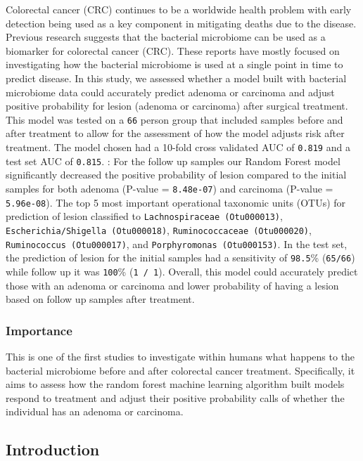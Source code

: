 \documentclass[12pt,]{article}
\begin{document}
Colorectal cancer (CRC) continues to be a worldwide health problem with
early detection being used as a key component in mitigating deaths due
to the disease. Previous research suggests that the bacterial microbiome
can be used as a biomarker for colorectal cancer (CRC). These reports
have mostly focused on investigating how the bacterial microbiome is
used at a single point in time to predict disease. In this study, we
assessed whether a model built with bacterial microbiome data could
accurately predict adenoma or carcinoma and adjust positive probability
for lesion (adenoma or carcinoma) after surgical treatment. This model
was tested on a \texttt{66} person group that included samples before
and after treatment to allow for the assessment of how the model adjusts
risk after treatment. The model chosen had a 10-fold cross validated AUC
of \texttt{0.819} and a test set AUC of \texttt{0.815}. : For the follow
up samples our Random Forest model significantly decreased the positive
probability of lesion compared to the initial samples for both adenoma
(P-value = \texttt{8.48e-07}) and carcinoma (P-value =
\texttt{5.96e-08}). The top 5 most important operational taxonomic units
(OTUs) for prediction of lesion classified to
\texttt{Lachnospiraceae\ (Otu000013)},
\texttt{Escherichia/Shigella\ (Otu000018)},
\texttt{Ruminococcaceae\ (Otu000020)},
\texttt{Ruminococcus\ (Otu000017)}, and
\texttt{Porphyromonas\ (Otu000153)}. In the test set, the prediction of
lesion for the initial samples had a sensitivity of \texttt{98.5}\%
(\texttt{65/66}) while follow up it was \texttt{100}\%
(\texttt{1\ /\ 1}). Overall, this model could accurately predict those
with an adenoma or carcinoma and lower probability of having a lesion
based on follow up samples after treatment.

\newpage

\subsubsection{Importance}\label{importance}

This is one of the first studies to investigate within humans what
happens to the bacterial microbiome before and after colorectal cancer
treatment. Specifically, it aims to assess how the random forest machine
learning algorithm built models respond to treatment and adjust their
positive probability calls of whether the individual has an adenoma or
carcinoma.

\newpage

\subsection{Introduction}\label{introduction}
\end{document}
